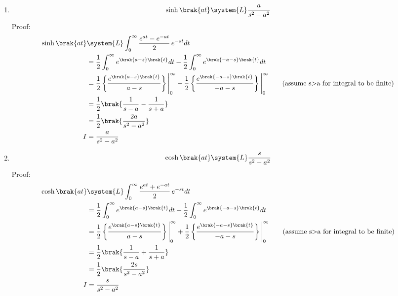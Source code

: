 \begin{enumerate}[label=\thesubsection.\arabic*,ref=\thesubsection.\theenumi]
\begin{align}
                          I&=\frac{a}{a^2}-\frac{s^2}{a^2}\brak{I}\\
       \brak{\frac{a^2+s^2}{a^2}}I&=\frac{a}{a^2}\\
                          I&=\frac{a}{s^2+a^2}
\end{align}
\item
\begin{align}
\sinh\brak{at}\system{L}\frac{a}{s^2-a^2}\label{eq:laplacesinh}
\end{align}
Proof:
\begin{align}
\sinh\brak{at}&\system{L}\int_0^\infty \frac{e^{at}-e^{-at}}{2}\,e^{-st} dt\\
                            &=\frac{1}{2}\int_0^\infty e^{\brak{a-s}\brak{t}} dt -\frac{1}{2}\int_0^\infty e^{\brak{-a-s}\brak{t}}dt\\
                            &=\frac{1}{2}\left\{\frac{e^{\brak{a-s}\brak{t}}}{a-s}\right\}\Bigg|_0^\infty-\frac{1}{2}\left\{\frac{e^{\brak{-a-s}\brak{t}}}{-a-s}\right\}\Bigg|_0^\infty\tag{assume s$>$a for integral to be finite}\\
                            &=\frac{1}{2}\brak{\frac{1}{s-a}-\frac{1}{s+a}}\\
                            &=\frac{1}{2}\brak{\frac{2a}{s^2-a^2}}\\
                           I&=\frac{a}{s^2-a^2}
\end{align}
\item
\begin{align}
\cosh\brak{at}\system{L}\frac{s}{s^2-a^2}\label{eq:laplacecosh}
\end{align}
Proof:
\begin{align}
\cosh\brak{at}&\system{L}\int_0^\infty \frac{e^{at}+e^{-at}}{2}\,e^{-st} dt\\
                            &=\frac{1}{2}\int_0^\infty e^{\brak{a-s}\brak{t}} dt +\frac{1}{2}\int_0^\infty e^{\brak{-a-s}\brak{t}}dt\\
                            &=\frac{1}{2}\left\{\frac{e^{\brak{a-s}\brak{t}}}{a-s}\right\}\Bigg|_0^\infty+\frac{1}{2}\left\{\frac{e^{\brak{-a-s}\brak{t}}}{-a-s}\right\}\Bigg|_0^\infty\tag{assume s$>$a for integral to be finite}\\
                            &=\frac{1}{2}\brak{\frac{1}{s-a}+\frac{1}{s+a}}\\
                            &=\frac{1}{2}\brak{\frac{2s}{s^2-a^2}}\\
                           I&=\frac{s}{s^2-a^2}
\end{align}


\end{enumerate}
